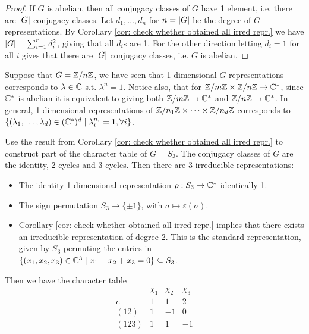 \begin{proof}
    If $G$ is abelian, then all conjugacy classes of $G$ have 1 element, i.e. there are $\left|G\right|$ conjugacy classes. Let $d_1, \dots, d_n$ for $n = \left|G\right|$ be the degree of $G$-representations. By Corollary \ref{cor: check whether obtained all irred repr.} we have $\left|G\right| = \sum_{i = 1}^r d_i^2$, giving that all $d_i$s are 1. For the other direction letting $d_i = 1$ for all $i$ gives that there are $\left|G\right|$ conjugacy classes, i.e. $G$ is abelian. 
\end{proof}

\begin{example}
    Suppose that $G = \mathbb{Z}/n\mathbb{Z}$, we have seen that 1-dimensional $G$-representations corresponds to $\lambda \in \mathbb{C}$ s.t. $\lambda^n = 1$. Notice also, that for $\mathbb{Z}/m\mathbb{Z} \times \mathbb{Z}/n\mathbb{Z} \to \mathbb{C}^{\ast}$, since $\mathbb{C}^{\ast}$ is abelian it is equivalent to giving both $\mathbb{Z}/m\mathbb{Z} \to \mathbb{C}^{\ast}$ and $\mathbb{Z}/n\mathbb{Z} \to \mathbb{C}^{\ast}$. In general, 1-dimensional representations of $\mathbb{Z}/n_1\mathbb{Z} \times \cdots \times \mathbb{Z}/n_d \mathbb{Z}$ corresponds to $\{ (\lambda_1, \dots, \lambda_d) \in (\mathbb{C}^{\ast})^d \mid \lambda_i ^{n_i} = 1, \forall i \}$.
\end{example}

\begin{example}
    Use the result from Corollary \ref{cor: check whether obtained all irred repr.} to construct part of the character table of $G = S_3$. The conjugacy classes of $G$ are the identity, 2-cycles and 3-cycles. Then there are 3 irreducible representations:
    \begin{itemize}[label=$-$]
        \item The identity 1-dimensional representation $\rho: S_3 \to \mathbb{C}^{\ast}$ identically 1.
        \item The sign permutation $S_3 \to \{\pm 1\}$, with $\sigma \mapsto \varepsilon(\sigma)$.
        \item Corollary \ref{cor: check whether obtained all irred repr.} implies that there exists an irreducible representation of degree 2. This is the \underline{standard representation}, given by $S_3$ permuting the entries in $\{ (x_1, x_2, x_3) \in \mathbb{C}^3 \mid x_1 + x_2 + x_3 = 0 \} \subseteq S_3$.
    \end{itemize}
    Then we have the character table
    \[
        \begin{array}{r|ccc}
            & \chi_1 & \chi_2 & \chi_3 \\
            \hline
            e & 1 & 1 & 2 \\
            (1 2) & 1 & -1 & 0 \\
            (1 2 3) & 1 & 1 & -1
        \end{array}
    \]
\end{example}

